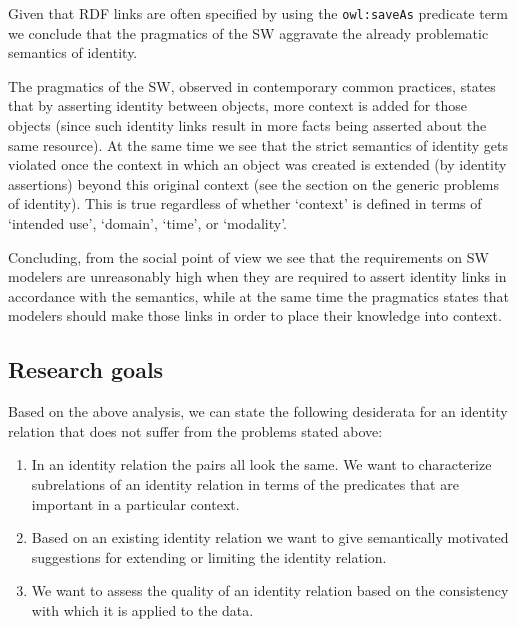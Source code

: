 \noindent Given that RDF links are often specified by using
  the {\small \texttt{owl:saveAs}} predicate term \cite{Void2011}
  we conclude that the pragmatics of the SW
aggravate the already problematic semantics of identity.

The pragmatics of the SW, observed in contemporary common practices,
  states that by asserting identity between objects,
  more context is added for those objects
  (since such identity links result in more facts being asserted
  about the same resource).
At the same time we see that the strict semantics of identity
  gets violated once the context in which an object was created
  is extended (by identity assertions) beyond this original context
  (see the section on the generic problems of identity).
This is true regardless of whether `context' is defined in terms of
  `intended use', `domain', `time', or `modality'.

Concluding, from the social point of view
  we see that the requirements on SW modelers
  are unreasonably high when they are required to
  assert identity links in accordance with the semantics, while
at the same time the pragmatics states that modelers should
  make those links in order to place their knowledge into context.



\subsection{Research goals}
\label{sec:research_goals}

Based on the above analysis, we can state the following desiderata for 
an identity relation that does not suffer from the problems stated above: 

\begin{enumerate}
\item In an identity relation the pairs all look the same.
      We want to characterize subrelations of an identity relation in terms
      of the predicates that are important in a particular context.
\item Based on an existing identity relation we want to give semantically
      motivated suggestions for extending or limiting the identity relation.
\item We want to assess the quality of an identity relation based on
      the consistency with which it is applied to the data.
\end{enumerate}
